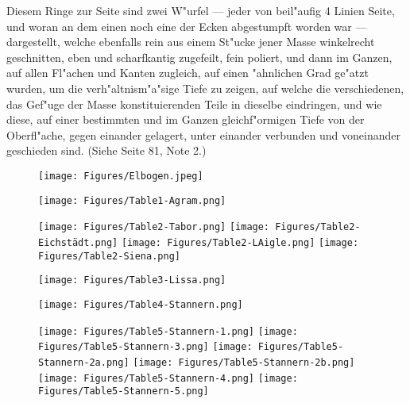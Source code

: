\documentclass[a4paper, 11pt, oneside, german]{article}
\begin{document}
Diesem Ringe zur Seite sind zwei W"urfel --- jeder von beil"aufig 4 Linien Seite, und woran an dem einen noch eine der Ecken abgestumpft worden war --- dargestellt, welche ebenfalls rein aus einem St"ucke jener Masse winkelrecht geschnitten, eben und scharfkantig zugefeilt, fein poliert, und dann im Ganzen, auf allen Fl"achen und Kanten zugleich, auf einen "ahnlichen Grad ge"atzt wurden, um die verh"altnism"a"sige Tiefe zu zeigen, auf welche die verschiedenen, das Gef"uge der Masse konstituierenden Teile in dieselbe eindringen, und wie diese, auf einer bestimmten und im Ganzen gleichf"ormigen Tiefe von der Oberfl"ache, gegen einander gelagert, unter einander verbunden und voneinander geschieden sind. (Siehe Seite 81, Note 2.)
\clearpage
\setlength\intextsep{0pt}
\pagestyle{fancy}
\fancyhf{}
\cfoot{\swabfamily{\thepage}}
\begin{figure}[p]
\texttt{[image: Figures/Elbogen.jpeg]}
\end{figure}
\clearpage
{}
\cfoot{\swabfamily{\thepage}}
\begin{figure}[p]
\texttt{[image: Figures/Table1-Agram.png]}
\end{figure}
\clearpage
{}
\cfoot{\swabfamily{\thepage}}
\begin{figure}[p]
\texttt{[image: Figures/Table2-Tabor.png]}
\texttt{[image: Figures/Table2-Eichstädt.png]}
\texttt{[image: Figures/Table2-LAigle.png]}
\texttt{[image: Figures/Table2-Siena.png]}
\end{figure}
\clearpage
{}
\cfoot{\swabfamily{\thepage}}
\begin{figure}[p]
\texttt{[image: Figures/Table3-Lissa.png]}
\end{figure}
\clearpage
{}
\cfoot{\swabfamily{\thepage}}
\begin{figure}[p]
\texttt{[image: Figures/Table4-Stannern.png]}
\end{figure}
\clearpage
{}
\cfoot{\swabfamily{\thepage}}
\begin{figure}[p]
\texttt{[image: Figures/Table5-Stannern-1.png]}
\texttt{[image: Figures/Table5-Stannern-3.png]}
\texttt{[image: Figures/Table5-Stannern-2a.png]}
\texttt{[image: Figures/Table5-Stannern-2b.png]}
\texttt{[image: Figures/Table5-Stannern-4.png]}
\texttt{[image: Figures/Table5-Stannern-5.png]}
\end{figure}
\end{document}

